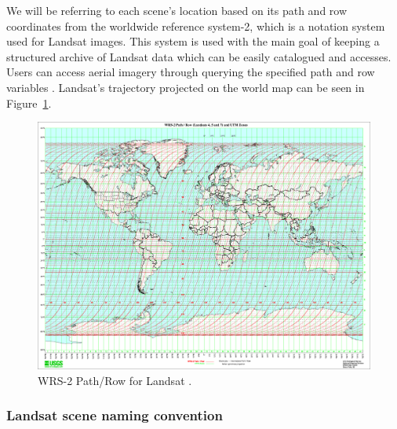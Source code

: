 \documentclass[12pt, a4paper]{report}
\begin{document}
	\par We will be referring to each scene's location based on its path and row coordinates from the worldwide reference system-2, which is a notation system used for Landsat images. This system is used with the main goal of keeping a structured archive of Landsat data which can be easily catalogued and accesses. Users can access aerial imagery through querying the specified path and row variables \cite{wrs}. Landsat's trajectory projected on the world map can be seen in Figure~\ref{fig:wrs2}.
	\begin{figure}[h]
		\centering
		\includegraphics[scale=0.2]{../images/wrs2.png}
		\caption{WRS-2 Path/Row for Landsat \cite{wrs}.}
		\label{fig:wrs2}
	\end{figure}
	
	\subsubsection{Landsat scene naming convention}
	\label{seq:landsat_naming}
	
\end{document}
